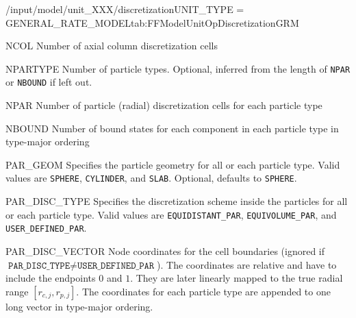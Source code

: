 \begin{condsubgroup}{/input/model/unit\_XXX/discretization}{UNIT\_TYPE = GENERAL\_RATE\_MODEL}{tab:FFModelUnitOpDiscretizationGRM}
  \begin{dataset}[type=int,range={$\geq 1$},length=1]{NCOL}
    Number of axial column discretization cells
  \end{dataset}
  \begin{dataset}[type=int,range={$\geq 1$},length=1]{NPARTYPE}
    Number of particle types.
    Optional, inferred from the length of \texttt{NPAR} or \texttt{NBOUND} if left out.
  \end{dataset}
  \begin{dataset}[type=int,range={$\geq 1$},length={$1$ / \texttt{NPARTYPE}}]{NPAR}
    Number of particle (radial) discretization cells for each particle type
  \end{dataset}
  \begin{dataset}[type=int,range={$\geq 0$},length={\texttt{NCOMP} / $\texttt{NPARTYPE} \cdot \texttt{NCOMP}$}]{NBOUND}
    Number of bound states for each component in each particle type in type-major ordering
  \end{dataset}
  \begin{dataset}[type=string,range={$\{ \texttt{SPHERE}, \texttt{CYLINDER}, \texttt{SLAB} \}$},length={$1$ / \texttt{NPARTYPE}}]{PAR\_GEOM}
    Specifies the particle geometry for all or each particle type.
    Valid values are \texttt{SPHERE}, \texttt{CYLINDER}, and \texttt{SLAB}.
    Optional, defaults to \texttt{SPHERE}.
  \end{dataset}
  \begin{dataset}[type=string,length={$1$ / \texttt{NPARTYPE}}]{PAR\_DISC\_TYPE}
    Specifies the discretization scheme inside the particles for all or each particle type.
    Valid values are \texttt{EQUIDISTANT\_PAR}, \texttt{EQUIVOLUME\_PAR}, and \texttt{USER\_DEFINED\_PAR}.
  \end{dataset}
  \begin{dataset}[unit=--,type=double,range={$[0,1]$},length={$\sum_i (\texttt{NPAR}_i + 1)$}]{PAR\_DISC\_VECTOR}
    Node coordinates for the cell boundaries (ignored if $\texttt{PAR\_DISC\_TYPE} \neq \texttt{USER\_DEFINED\_PAR}$).
    The coordinates are relative and have to include the endpoints $0$ and $1$.
    They are later linearly mapped to the true radial range $[r_{c,j}, r_{p,j}]$.
    The coordinates for each particle type are appended to one long vector in type-major ordering.
  \end{dataset}

\end{condsubgroup}

